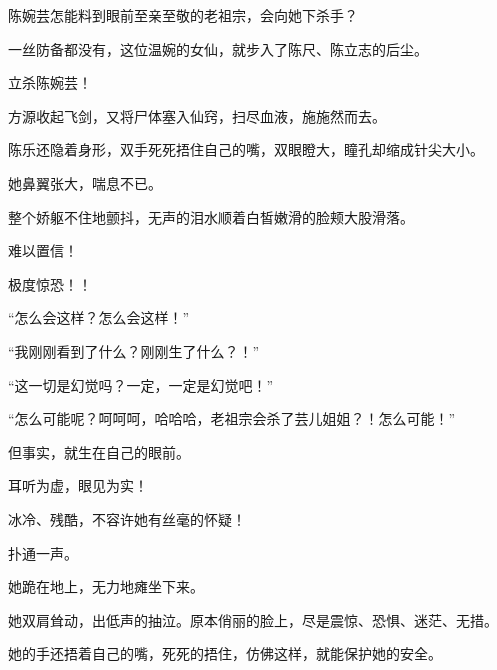 \begin{this_body}
陈婉芸怎能料到眼前至亲至敬的老祖宗，会向她下杀手？

一丝防备都没有，这位温婉的女仙，就步入了陈尺、陈立志的后尘。

立杀陈婉芸！

方源收起飞剑，又将尸体塞入仙窍，扫尽血液，施施然而去。

陈乐还隐着身形，双手死死捂住自己的嘴，双眼瞪大，瞳孔却缩成针尖大小。

她鼻翼张大，喘息不已。

整个娇躯不住地颤抖，无声的泪水顺着白皙嫩滑的脸颊大股滑落。

难以置信！

极度惊恐！！

“怎么会这样？怎么会这样！”

“我刚刚看到了什么？刚刚生了什么？！”

“这一切是幻觉吗？一定，一定是幻觉吧！”

“怎么可能呢？呵呵呵，哈哈哈，老祖宗会杀了芸儿姐姐？！怎么可能！”

但事实，就生在自己的眼前。

耳听为虚，眼见为实！

冰冷、残酷，不容许她有丝毫的怀疑！

扑通一声。

她跪在地上，无力地瘫坐下来。

她双肩耸动，出低声的抽泣。原本俏丽的脸上，尽是震惊、恐惧、迷茫、无措。

她的手还捂着自己的嘴，死死的捂住，仿佛这样，就能保护她的安全。

\end{this_body}

